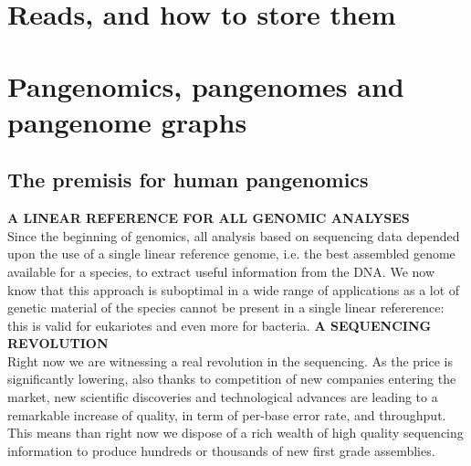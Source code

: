 \section{Reads, \kmers and how to store them}

\section{Pangenomics, pangenomes and pangenome graphs}
\label{sec:background:pangenomics}
\subsection{The premisis for human pangenomics}
\large{\textbf{A LINEAR REFERENCE FOR ALL GENOMIC ANALYSES}}\\
Since the beginning of genomics, all analysis based on sequencing data depended upon the use of a single linear reference genome, i.e. the best assembled genome available for a species, to extract useful information from the DNA. We now know that this approach is suboptimal in a wide range of applications as a lot of genetic material of the species cannot be present in a single linear refererence: this is valid for eukariotes and even more for bacteria.  
\huge{\textbf{A SEQUENCING REVOLUTION}}\\
Right now we are witnessing a real revolution in the sequencing. As the price is significantly lowering, also thanks to competition of new companies entering the market, new scientific discoveries and technological advances are leading to a remarkable increase of quality, in term of per-base error rate, and throughput. This means than right now we dispose of a rich wealth of high quality sequencing information to produce hundreds or thousands of new first grade assemblies.

